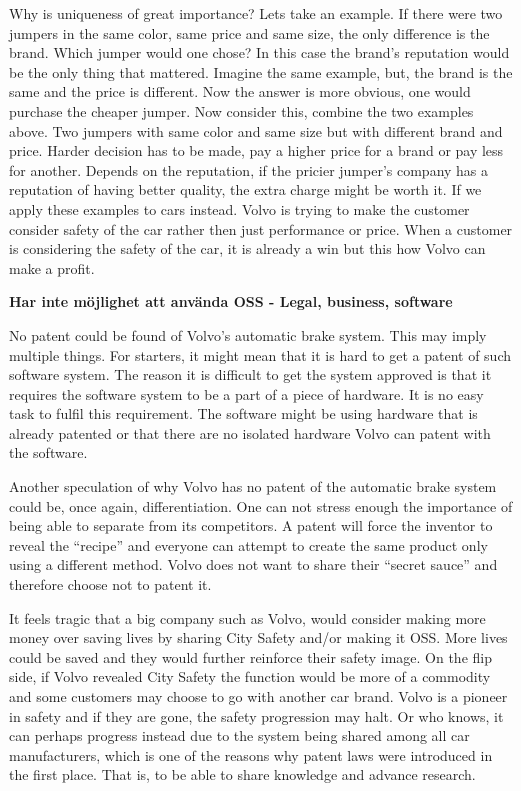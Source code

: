 \documentclass[conference]{IEEEtran}
\begin{document}
Why is uniqueness of great importance? Lets take an example. If there were two jumpers in the same color, same price and same size, the only difference is the brand. Which jumper would one chose? In this case the brand's reputation would be the only thing that mattered. Imagine the same example, but, the brand is the same and the price is different. Now the answer is more obvious, one would purchase the cheaper jumper. Now consider this, combine the two examples above. Two jumpers with same color and same size but with different brand and price. Harder decision has to be made, pay a higher price for a brand or pay less for another. Depends on the reputation, if the pricier jumper's company has a reputation of having better quality, the extra charge might be worth it. If we apply these examples to cars instead. Volvo is trying to make the customer consider safety of the car rather then just performance or price. When a customer is considering the safety of the car, it is already a win but this how Volvo can make a profit.

\textbf{Har inte m\"ojlighet att anv\"anda OSS - Legal, business, software}

No patent could be found of Volvo's automatic brake system. This may imply multiple things. For starters, it might mean that it is hard to get a patent of such software system. The reason it is difficult to get the system approved is that it requires the software system to be a part of a piece of hardware. It is no easy task to fulfil this requirement. The software might be using hardware that is already patented or that there are no isolated hardware Volvo can patent with the software. 

Another speculation of why Volvo has no patent of the automatic brake system could be, once again, differentiation. One can not stress enough the importance of being able to separate from its competitors. A patent will force the inventor to reveal the ``recipe'' and everyone can attempt to create the same product only using a different method. Volvo does not want to share their ``secret sauce'' and therefore choose not to patent it. 

It feels tragic that a big company such as Volvo, would consider making more money over saving lives by sharing City Safety and/or making it OSS. More lives could be saved and they would further reinforce their safety image. On the flip side, if Volvo revealed City Safety the function would be more of a commodity and some customers may choose to go with another car brand. Volvo is a pioneer in safety and if they are gone, the safety progression may halt. Or who knows, it can perhaps progress instead due to the system being shared among all car manufacturers, which is one of the reasons why patent laws were introduced in the first place. That is, to be able to share knowledge and advance research.\cite{SoftwarePatent}
\iffalse
\end{document}
